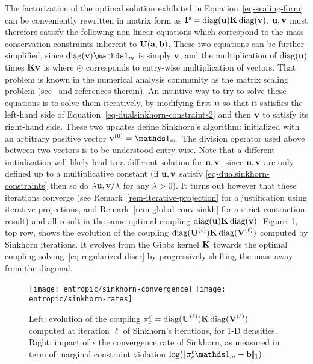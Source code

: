 The factorization of the optimal solution exhibited in Equation~\eqref{eq-scaling-form} can be conveniently rewritten in matrix form as $\mathrm{\textbf{\upshape P}}=\operatorname{diag}(\mathrm{\textbf{\upshape u}})\mathrm{\textbf{\upshape K}}\operatorname{diag}(\mathrm{\textbf{\upshape v}})$.
%
$\mathrm{\textbf{\upshape u}},\mathrm{\textbf{\upshape v}}$ must therefore satisfy the following non-linear equations which correspond to the mass conservation constraints inherent to $\mathrm{\textbf{\upshape U}}(\mathrm{\textbf{\upshape a}},\mathrm{\textbf{\upshape b}})$,
These two equations can be further simplified, since $\diag(\vD)\ones_m$ is simply $\mathrm{\textbf{\upshape v}}$, and the multiplication of $\operatorname{diag}(\mathrm{\textbf{\upshape u}})$ times $\mathrm{\textbf{\upshape K}} \mathrm{\textbf{\upshape v}}$ is 
\eql{\label{eq-dualsinkhorn-constraints2}
	\uD \odot (\K \vD) = \a
	\qandq
	\vD \odot (\transp{\K}\uD) = \b
}
where $\odot$ corresponds to entry-wise multiplication of vectors. That problem is known in the numerical analysis community as the matrix scaling problem (see~\cite{nemirovski1999complexity} and references therein).
%
An intuitive way to try to solve these equations is to solve them iteratively, by modifying first $\mathrm{\textbf{\upshape u}}$ so that it satisfies the left-hand side of Equation~\eqref{eq-dualsinkhorn-constraints2} and then $\mathrm{\textbf{\upshape v}}$ to satisfy its right-hand side. These two updates define Sinkhorn's algorithm:
\eql{\label{eq-sinkhorn}	
	\itt{\uD} \eqdef \frac{\a}{\K \it{\vD}}
	\qandq
	\itt{\vD} \eqdef \frac{\b}{\transp{\K}\itt{\uD}},
}
initialized with an arbitrary positive vector $\init{\vD} = \ones_m$. The division operator used above between two vectors is to be understood entry-wise. Note that a different initialization will likely lead to a different solution for $\mathrm{\textbf{\upshape u}},\mathrm{\textbf{\upshape v}}$, since $\mathrm{\textbf{\upshape u}},\mathrm{\textbf{\upshape v}}$ are only defined up to a multiplicative constant (if $\mathrm{\textbf{\upshape u}},\mathrm{\textbf{\upshape v}}$ satisfy \eqref{eq-dualsinkhorn-constraints} then so do $\lambda\mathrm{\textbf{\upshape u}},\mathrm{\textbf{\upshape v}}/\lambda$ for any $\lambda>0$).
%
It turns out however that these iterations converge (see Remark~\ref{rem-iterative-projection} for a justification using iterative projections, and Remark~\ref{rem-global-conv-sinkh} for a strict contraction result) and all result in the same optimal coupling $\operatorname{diag}(\mathrm{\textbf{\upshape u}})\mathrm{\textbf{\upshape K}}\operatorname{diag}(\mathrm{\textbf{\upshape v}})$. 
%
Figure~\ref{fig-sinkhorn-convergence}, top row, shows the evolution of the coupling $\operatorname{diag}(\mathrm{\textbf{\upshape U}}^{(\ell)})\mathrm{\textbf{\upshape K}}\operatorname{diag}(\mathrm{\textbf{\upshape V}}^{(\ell)})$ computed by Sinkhorn iterations. It  evolves from the Gibbs kernel $\mathrm{\textbf{\upshape K}}$ towards the optimal coupling solving~\eqref{eq-regularized-discr} by progressively shifting the mass away from the diagonal.


\begin{figure}
\centering
\texttt{[image: entropic/sinkhorn-convergence]}
\texttt{[image: entropic/sinkhorn-rates]}
\caption{\label{fig-sinkhorn-convergence}
Left: evolution of the coupling $\pi_\varepsilon^\ell=\operatorname{diag}(\mathrm{\textbf{\upshape U}}^{(\ell)})\mathrm{\textbf{\upshape K}}\operatorname{diag}(\mathrm{\textbf{\upshape V}}^{(\ell)})$ computed at iteration $\ell$ of Sinkhorn's iterations, for 1-D densities.
Right: impact of $\epsilon$ the convergence rate of Sinkhorn, as measured in term of marginal constraint violation $\log( \norm{\pi_\epsilon^\ell \ones_m - \b}_1 )$.
}
\end{figure}



